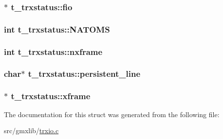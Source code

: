 \hypertarget{structt__trxstatus_a94e797a6b7dfbc41168dccc41d711a15}{
\subsubsection[{fio}]{$\ast$ {\bf t\-\_\-trxstatus\-::fio}}}\label{structt__trxstatus_a94e797a6b7dfbc41168dccc41d711a15}
\hypertarget{structt__trxstatus_ab9dc26263c83e04bc3af3f977844110d}{
\subsubsection[{\-N\-A\-T\-O\-M\-S}]{\setlength{\rightskip}{0pt plus 5cm}int {\bf t\-\_\-trxstatus\-::\-N\-A\-T\-O\-M\-S}}}\label{structt__trxstatus_ab9dc26263c83e04bc3af3f977844110d}
\hypertarget{structt__trxstatus_a0b42d115b748bfe58920afcec963da85}{
\subsubsection[{nxframe}]{\setlength{\rightskip}{0pt plus 5cm}int {\bf t\-\_\-trxstatus\-::nxframe}}}\label{structt__trxstatus_a0b42d115b748bfe58920afcec963da85}
\hypertarget{structt__trxstatus_abce784fd934379f79ad78a48c8bdb8c3}{
\subsubsection[{persistent\-\_\-line}]{\setlength{\rightskip}{0pt plus 5cm}char$\ast$ {\bf t\-\_\-trxstatus\-::persistent\-\_\-line}}}\label{structt__trxstatus_abce784fd934379f79ad78a48c8bdb8c3}
\hypertarget{structt__trxstatus_af8640393cc528042718edeb61dd1a8fb}{
\subsubsection[{xframe}]{$\ast$ {\bf t\-\_\-trxstatus\-::xframe}}}\label{structt__trxstatus_af8640393cc528042718edeb61dd1a8fb}


\-The documentation for this struct was generated from the following file\-:\begin{DoxyCompactItemize}
\item 
src/gmxlib/\hyperlink{trxio_8c}{trxio.\-c}\end{DoxyCompactItemize}
